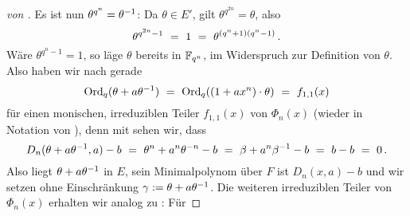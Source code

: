 \begin{proof}[von ]
  Es ist nun $\theta^{q^n} = \theta^{-1}$: 
  Da $\theta \in E'$, gilt $\theta^{q^{2n}} = \theta$, also
  \[ \theta^{q^{2n}-1} \ =\  1 \ =\  \theta^{(q^n+1)(q^n-1)}\,. \]
  Wäre $\theta^{q^n-1} = 1$, so läge $\theta$ bereits in $\mathbb{F}_{q^n}$, im Widerspruch
  zur Definition von $\theta$.
  Also haben wir nach  
  gerade 
  \[ \operatorname{Ord}_q(\theta + a\theta^{-1}) \ =\ 
    \operatorname{Ord}_q((1+ax^n)\cdot \theta) \ =\  f_{1,1}(x)\]
  für einen monischen, irreduziblen Teiler $f_{1,1}(x)$ von $\Phi_n(x)$
  (wieder in Notation von ), denn
  mit  sehen wir, dass
  \[ D_n(\theta + a\theta^{-1},a) -b \ =\  \theta^n + a^n\theta^{-n} -b
    \ =\  \beta +a^n\beta^{-1} -b \ =\  b - b\ =\  0\,.\]
  Also liegt $\theta +a\theta^{-1}$ in $E$, sein Minimalpolynom über
  $F$ ist $D_n(x,a)-b$ und wir setzen ohne Einschränkung 
  $\gamma:= \theta+a\theta^{-1}$.
  Die weiteren irreduziblen Teiler von $\Phi_n(x)$
  erhalten wir analog zu : Für 

\end{proof}
